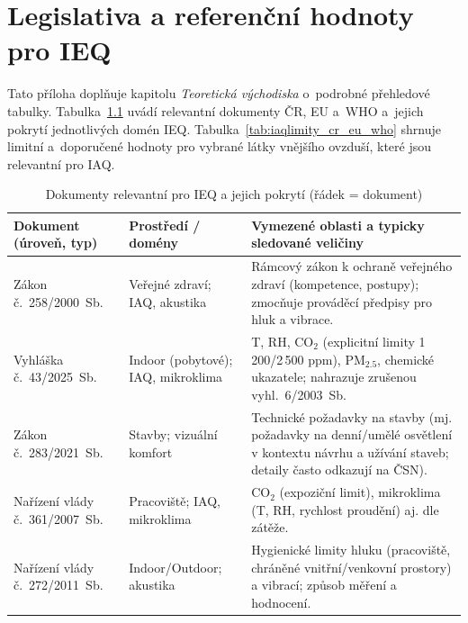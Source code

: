 \chapter{Legislativa a referenční hodnoty pro IEQ}
\label{app:legislativa}

Tato příloha doplňuje kapitolu \textit{Teoretická východiska} o~podrobné přehledové tabulky. Tabulka~\ref{tab:legislativa_ieq_dokumenty} uvádí relevantní dokumenty ČR, EU a~WHO a~jejich pokrytí jednotlivých domén IEQ. Tabulka~\ref{tab:iaqlimity_cr_eu_who} shrnuje limitní a~doporučené hodnoty pro vybrané látky vnějšího ovzduší, které jsou relevantní pro IAQ.

\begin{table}[p]

\begin{center}
\setlength{\tabcolsep}{3pt}
\renewcommand{\arraystretch}{1.05}
\scriptsize
\caption{Dokumenty relevantní pro IEQ a jejich pokrytí (řádek = dokument)}\label{tab:legislativa_ieq_dokumenty}
\begin{tabularx}{\textwidth}{@{}
>{\raggedright\arraybackslash}p{}
  >{\raggedright\arraybackslash}p{}
  X@{}}
\toprule
\textbf{Dokument (úroveň, typ)} & \textbf{Prostředí / domény} & \textbf{Vymezené oblasti a typicky sledované veličiny} \\
\midrule

Zákon č.~258/2000~Sb. &
Veřejné zdraví; IAQ, akustika &
Rámcový zákon k ochraně veřejného zdraví (kompetence, postupy); zmocňuje prováděcí předpisy pro hluk a vibrace. \\
Vyhláška č.~43/2025~Sb. &
Indoor (pobytové); IAQ, mikroklima &
T, RH, CO$_2$ (explicitní limity 1\,200/2\,500 ppm), PM$_{2.5}$, chemické ukazatele; nahrazuje zrušenou vyhl.~6/2003~Sb. \\

Zákon č.~283/2021~Sb. &
Stavby; vizuální komfort &
Technické požadavky na stavby (mj. požadavky na denní/umělé osvětlení v kontextu návrhu a užívání staveb; detaily často odkazují na ČSN). \\

Nařízení vlády č.~361/2007~Sb. &
Pracoviště; IAQ, mikroklima &
CO$_2$ (expoziční limit), mikroklima (T, RH, rychlost proudění) aj. dle zátěže. \\

Nařízení vlády č.~272/2011~Sb. &
Indoor/Outdoor; akustika &
Hygienické limity hluku (pracoviště, chráněné vnitřní/venkovní prostory) a vibrací; způsob měření a hodnocení. \\


\end{tabularx}
\end{center}
\end{table}
